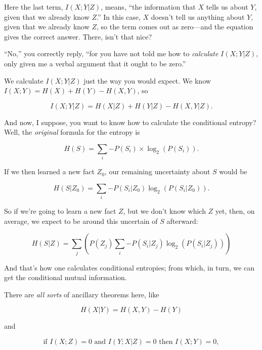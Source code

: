 {
 Here the last term, $I(X;Y |Z)$, means,
``the information that $X$ tells us about $Y$, given that
we already know $Z$.'' In this case, $X$
doesn't tell us anything about $Y$, given that we already
know $Z$, so the term comes out as zero---and the equation gives the
correct answer. There, isn't that nice? }

{
 ``No,'' you correctly reply,
``for you have not told me how to \textit{calculate}
$I(X;Y|Z)$, only given me a verbal argument that it ought to be
zero.''}

{
 We calculate $I(X;Y|Z)$ just the way you would expect. We
know $I(X;Y) = H(X) + H(Y) - H(X,Y)$, so}

\begin{equation*}
  I(X;Y|Z) = H(X|Z) + H(Y|Z) - H(X,Y|Z).
\end{equation*}


{
 And now, I suppose, you want to know how to calculate the
conditional entropy? Well, the \textit{original} formula for the
entropy is}

\begin{equation*}
 H(S) = \sum_{i}{-P(S_{i}) \times \log_{2}(P(S_{i}))}.
\end{equation*}


{
 If we then learned a new fact $Z_{0}$, our remaining
uncertainty about $S$ would be}

\begin{equation*}
 H(S|Z_0) =\sum_{i}{-P(S_{i}|Z_{0})\log_{2}(P(S_{i}|Z_{0}))}.
\end{equation*}

{
 So if we're going to learn a new fact $Z$, but we
don't know which $Z$ yet, then, on average, we expect to
be around this uncertain of $S$ afterward:}

\begin{equation*}
 H(S|Z) =\sum_{j}\left(P(Z_{j})\sum_{i}{-P(S_{i}|Z_{j})\log_{2}(P(S_{i}|Z_{j}))}\right)
\end{equation*}

{
 And that's how one calculates conditional
entropies; from which, in turn, we can get the conditional mutual
information. }

{
 There are \textit{all sorts} of ancillary theorems here, like}

\begin{equation*}
 H(X|Y) = H (X,Y) - H(Y)
\end{equation*}


{
 and}

\begin{equation*}
\text{if }I(X;Z) = 0\text{ and }I(Y;X|Z) = 0\text{ then }I(X;Y) = 0,
\end{equation*}


